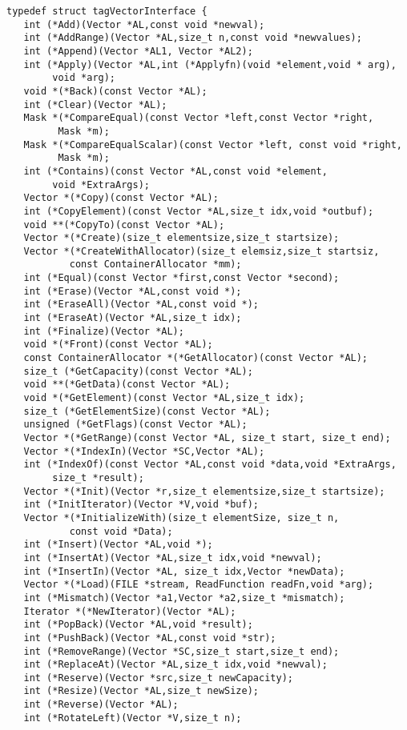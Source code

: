 \begin{verbatim}
typedef struct tagVectorInterface {
   int (*Add)(Vector *AL,const void *newval);
   int (*AddRange)(Vector *AL,size_t n,const void *newvalues);
   int (*Append)(Vector *AL1, Vector *AL2);
   int (*Apply)(Vector *AL,int (*Applyfn)(void *element,void * arg),
        void *arg);
   void *(*Back)(const Vector *AL);
   int (*Clear)(Vector *AL);
   Mask *(*CompareEqual)(const Vector *left,const Vector *right,
         Mask *m);
   Mask *(*CompareEqualScalar)(const Vector *left, const void *right,
         Mask *m);
   int (*Contains)(const Vector *AL,const void *element,
        void *ExtraArgs);
   Vector *(*Copy)(const Vector *AL);
   int (*CopyElement)(const Vector *AL,size_t idx,void *outbuf);
   void **(*CopyTo)(const Vector *AL);
   Vector *(*Create)(size_t elementsize,size_t startsize);
   Vector *(*CreateWithAllocator)(size_t elemsiz,size_t startsiz,
           const ContainerAllocator *mm);
   int (*Equal)(const Vector *first,const Vector *second);
   int (*Erase)(Vector *AL,const void *);
   int (*EraseAll)(Vector *AL,const void *);
   int (*EraseAt)(Vector *AL,size_t idx);
   int (*Finalize)(Vector *AL);
   void *(*Front)(const Vector *AL);
   const ContainerAllocator *(*GetAllocator)(const Vector *AL);
   size_t (*GetCapacity)(const Vector *AL);
   void **(*GetData)(const Vector *AL);
   void *(*GetElement)(const Vector *AL,size_t idx);
   size_t (*GetElementSize)(const Vector *AL);
   unsigned (*GetFlags)(const Vector *AL);
   Vector *(*GetRange)(const Vector *AL, size_t start, size_t end);
   Vector *(*IndexIn)(Vector *SC,Vector *AL);
   int (*IndexOf)(const Vector *AL,const void *data,void *ExtraArgs,
        size_t *result);
   Vector *(*Init)(Vector *r,size_t elementsize,size_t startsize);
   int (*InitIterator)(Vector *V,void *buf);
   Vector *(*InitializeWith)(size_t elementSize, size_t n,
           const void *Data);
   int (*Insert)(Vector *AL,void *);
   int (*InsertAt)(Vector *AL,size_t idx,void *newval);
   int (*InsertIn)(Vector *AL, size_t idx,Vector *newData);
   Vector *(*Load)(FILE *stream, ReadFunction readFn,void *arg);
   int (*Mismatch)(Vector *a1,Vector *a2,size_t *mismatch);
   Iterator *(*NewIterator)(Vector *AL);
   int (*PopBack)(Vector *AL,void *result);
   int (*PushBack)(Vector *AL,const void *str);
   int (*RemoveRange)(Vector *SC,size_t start,size_t end);
   int (*ReplaceAt)(Vector *AL,size_t idx,void *newval);
   int (*Reserve)(Vector *src,size_t newCapacity);
   int (*Resize)(Vector *AL,size_t newSize);
   int (*Reverse)(Vector *AL);
   int (*RotateLeft)(Vector *V,size_t n);

\end{verbatim}
